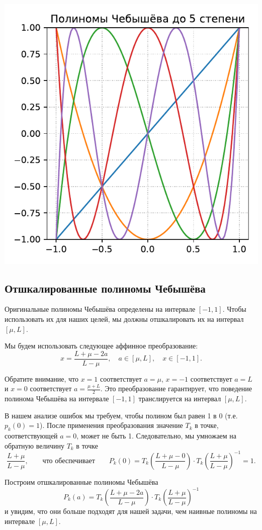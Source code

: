 \documentclass[
  russian,
  letterpaper,
  DIV=11,
  numbers=noendperiod]{scrartcl}
\begin{document}
\includegraphics[width=0.5\columnwidth]{gd_polynom_cheb_5_ru.pdf}

\subsection{Отшкалированные полиномы
Чебышёва}\label{ux43eux442ux448ux43aux430ux43bux438ux440ux43eux432ux430ux43dux43dux44bux435-ux43fux43eux43bux438ux43dux43eux43cux44b-ux447ux435ux431ux44bux448ux451ux432ux430}

Оригинальные полиномы Чебышёва определены на интервале \([-1,1]\). Чтобы
использовать их для наших целей, мы должны отшкалировать их на интервал
\([\mu,L]\).

Мы будем использовать следующее аффинное преобразование: \[
x = \frac{L + \mu - 2a}{L - \mu}, \quad a \in [\mu,L], \quad x \in [-1,1]. 
\]

Обратите внимание, что \(x=1\) соответствует \(a=\mu\), \(x=-1\)
соответствует \(a=L\) и \(x=0\) соответствует \(a=\frac{\mu+L}{2}\). Это
преобразование гарантирует, что поведение полинома Чебышёва на интервале
\([-1,1]\) транслируется на интервал \([\mu, L]\).

В нашем анализе ошибок мы требуем, чтобы полином был равен 1 в 0 (т.е.
\(p_k(0)=1\)). После применения преобразования значение \(T_k\) в точке,
соответствующей \(a=0\), может не быть 1. Следовательно, мы умножаем на
обратную величину \(T_k\) в точке \[
\frac{L+\mu}{L-\mu}, \qquad \text{что обеспечивает} \qquad P_k(0)= T_k\left(\frac{L+\mu-0}{L-\mu}\right) \cdot T_k\left(\frac{L+\mu}{L-\mu}\right)^{-1} = 1.
\]

Построим отшкалированные полиномы Чебышёва \[
P_k(a) = T_k\left(\frac{L+\mu-2a}{L-\mu}\right) \cdot T_k\left(\frac{L+\mu}{L-\mu}\right)^{-1}
\] и увидим, что они больше подходят для нашей задачи, чем наивные
полиномы на интервале \([\mu,L]\).
\end{document}
